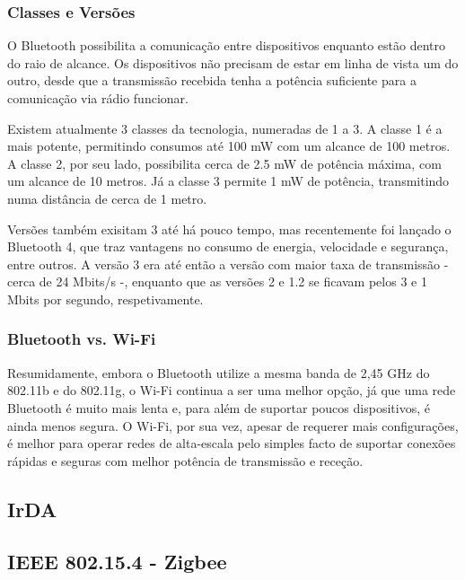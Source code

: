 \documentclass[conference]{IEEEtran}
\begin{document}
\subsubsection{Classes e Versões}

O Bluetooth possibilita a comunicação entre dispositivos enquanto estão dentro do raio de alcance. Os dispositivos não precisam de estar em linha de vista um do outro, desde que a transmissão recebida tenha a potência suficiente para a comunicação via rádio funcionar.

Existem atualmente 3 classes da tecnologia, numeradas de 1 a 3. A classe 1 é a mais potente, permitindo consumos até 100 mW com um alcance de 100 metros. A classe 2, por seu lado, possibilita cerca de 2.5 mW de potência máxima, com um alcance de 10 metros. Já a classe 3 permite 1 mW de potência, transmitindo numa distância de cerca de 1 metro.

Versões também exisitam 3 até há pouco tempo, mas recentemente foi lançado o Bluetooth 4, que traz vantagens no consumo de energia, velocidade e segurança, entre outros. A versão 3 era até então a versão com maior taxa de transmissão - cerca de 24 Mbits/s -, enquanto que as versões 2 e 1.2 se ficavam pelos 3 e 1 Mbits por segundo, respetivamente.

\subsubsection{Bluetooth vs. Wi-Fi}

Resumidamente, embora o Bluetooth utilize a mesma banda de 2,45 GHz do 802.11b e do 802.11g, o Wi-Fi continua a ser uma melhor opção, já que uma rede Bluetooth é muito mais lenta e, para além de suportar poucos dispositivos, é ainda menos segura. O Wi-Fi, por sua vez, apesar de requerer mais configurações, é melhor para operar redes de alta-escala pelo simples facto de suportar conexões rápidas e seguras com melhor potência de transmissão e receção.

\subsection{IrDA}

\subsection{IEEE 802.15.4 - Zigbee}

\end{document}
